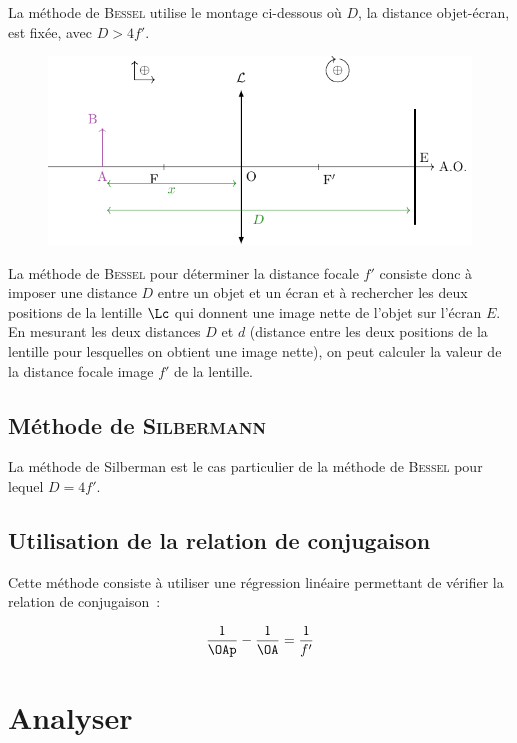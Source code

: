 \documentclass[../main/main.tex]{subfiles}
\begin{document}
{	La méthode de \textsc{Bessel} utilise le montage ci-dessous où $D$, la distance
	objet-écran, est fixée, avec $D>4f'$.
	\begin{figure}[]
		\centering
		\includegraphics[width=.8\linewidth]{lent_conv-condition_plain}
	\end{figure}

	La méthode de \textsc{Bessel} pour déterminer la distance focale $f'$ consiste donc à
	imposer une distance $D$ entre un objet et un écran et à rechercher les deux
	positions de la lentille $\Lc$ qui donnent une image nette de l'objet sur l'écran
	$E$. En mesurant les deux distances $D$ et $d$ (distance entre les deux
	positions de la lentille pour lesquelles on obtient une image nette), on peut
	calculer la valeur de la distance focale image $f'$ de la lentille.

	\subsection{Méthode de \textsc{Silbermann}}

	La méthode de Silberman est le cas particulier de la méthode de \textsc{Bessel} pour
	lequel $D=4f'$.

	\subsection{Utilisation de la relation de conjugaison}

	Cette méthode consiste à utiliser une régression linéaire permettant de vérifier
	la relation de conjugaison~:

	\[
		\frac{1}{\OAp}-\dfrac{1}{\OA} = \dfrac{1}{f'}
	\]
}

\setcounter{section}{2}
\section{Analyser}
\end{document}
